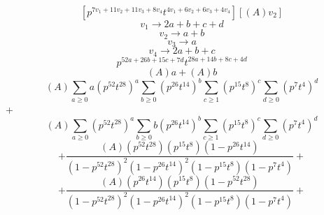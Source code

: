 \documentclass{article}
\begin{document}
            \[[p^{7v_1+11v_2+11v_3+8v_4}t^{4v_1+6v_2+6v_3+4v_4}][(A)v_2]\]\[v_1\rightarrow{2a+b+c+d}\]\[v_2\rightarrow{a+b}\]\[v_3\rightarrow{a}\]\[v_4\rightarrow{2a+b+c}\]\[p^{52a+26b+15c+7d}t^{28a+14b+8c+4d}\]\[(A)a+(A)b\]\[(A)\sum_{a\geq{0}}a(p^{52}t^{28})^{a}\sum_{b\geq{0}}(p^{26}t^{14})^{b}\sum_{c\geq{1}}(p^{15}t^{8})^{c}\sum_{d\geq{0}}(p^{7}t^{4})^{d}\]+\[(A)\sum_{a\geq{0}}(p^{52}t^{28})^{a}\sum_{b\geq{0}}b(p^{26}t^{14})^{b}\sum_{c\geq{1}}(p^{15}t^{8})^{c}\sum_{d\geq{0}}(p^{7}t^{4})^{d}\]\[+\frac{(A)(p^{52}t^{28})(p^{15}t^{8})(1-p^{26}t^{14})}{(1-p^{52}t^{28})^{2}(1-p^{26}t^{14})^{2}(1-p^{15}t^{8})(1-p^{7}t^{4})}+\]\[+\frac{(A)(p^{26}t^{14})(p^{15}t^{8})(1-p^{52}t^{28})}{(1-p^{52}t^{28})^{2}(1-p^{26}t^{14})^{2}(1-p^{15}t^{8})(1-p^{7}t^{4})}+\]
\end{document}
